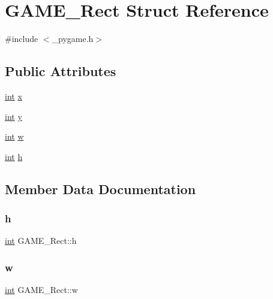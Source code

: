 \hypertarget{struct_g_a_m_e___rect}{}\section{G\+A\+M\+E\+\_\+\+Rect Struct Reference}
\label{struct_g_a_m_e___rect}


{\ttfamily \#include $<$\+\_\+pygame.\+h$>$}

\subsection*{Public Attributes}
\begin{DoxyCompactItemize}
\item 
\mbox{\hyperlink{warnings_8h_a74f207b5aa4ba51c3a2ad59b219a423b}{int}} \mbox{\hyperlink{struct_g_a_m_e___rect_a23ec041bc338ec0798414b9558592b55}{x}}
\item 
\mbox{\hyperlink{warnings_8h_a74f207b5aa4ba51c3a2ad59b219a423b}{int}} \mbox{\hyperlink{struct_g_a_m_e___rect_aefd438e3954fa6a8c4205bde866e96f0}{y}}
\item 
\mbox{\hyperlink{warnings_8h_a74f207b5aa4ba51c3a2ad59b219a423b}{int}} \mbox{\hyperlink{struct_g_a_m_e___rect_aa5113cae1939a100e1ebb65055a8f5aa}{w}}
\item 
\mbox{\hyperlink{warnings_8h_a74f207b5aa4ba51c3a2ad59b219a423b}{int}} \mbox{\hyperlink{struct_g_a_m_e___rect_a5852e1136a847290b8698a83520205ec}{h}}
\end{DoxyCompactItemize}


\subsection{Member Data Documentation}
\mbox{\label{struct_g_a_m_e___rect_a5852e1136a847290b8698a83520205ec}} 
\subsubsection{\texorpdfstring{h}{h}}
{\footnotesize\ttfamily \mbox{\hyperlink{warnings_8h_a74f207b5aa4ba51c3a2ad59b219a423b}{int}} G\+A\+M\+E\+\_\+\+Rect\+::h}

\mbox{\label{struct_g_a_m_e___rect_aa5113cae1939a100e1ebb65055a8f5aa}} 
\subsubsection{\texorpdfstring{w}{w}}
{\footnotesize\ttfamily \mbox{\hyperlink{warnings_8h_a74f207b5aa4ba51c3a2ad59b219a423b}{int}} G\+A\+M\+E\+\_\+\+Rect\+::w}

